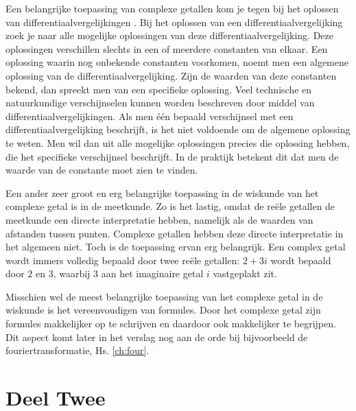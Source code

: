 \documentclass[11pt,fleqn]{book} %
\begin{document}
Een belangrijke toepassing van complexe getallen kom je tegen bij het oplossen van differentiaalvergelijkingen \cite{complexegetallenleiden}. Bij het oplossen van een differentiaalvergelijking zoek je naar alle mogelijke oplossingen van deze differentiaalvergelijking. Deze oplossingen verschillen slechts in een of meerdere constanten van elkaar. Een oplossing waarin nog onbekende constanten voorkomen, noemt men een algemene oplossing van de differentiaalvergelijking. Zijn de waarden van deze constanten bekend, dan spreekt men van een specifieke oplossing. Veel technische en natuurkundige verschijnselen kunnen worden beschreven door middel van differentiaalvergelijkingen. Als men één bepaald verschijnsel met een differentiaalvergelijking beschrijft, is het niet voldoende om de algemene oplossing te weten. Men wil dan uit alle mogelijke oplossingen precies die oplossing hebben, die het specifieke verschijnsel beschrijft. In de praktijk betekent dit dat men de waarde van de constante moet zien te vinden.

Een ander zeer groot en erg belangrijke toepassing in de wiskunde van het complexe getal is in de meetkunde. Zo is het lastig, omdat de reële getallen de meetkunde een directe interpretatie hebben, namelijk als de waarden van afstanden tussen punten. Complexe getallen hebben deze directe interpretatie in het algemeen niet. Toch is de toepassing ervan erg belangrijk. Een complex getal wordt immers volledig bepaald door twee reële getallen: $2 + 3i$ wordt bepaald door $2$ en $3$, waarbij $3$ aan het imaginaire getal $i$ vastgeplakt zit.

Misschien wel de meest belangrijke toepassing van het complexe getal in de wiskunde is het vereenvoudigen van formules. Door het complexe getal zijn formules makkelijker op te schrijven en daardoor ook makkelijker te begrijpen. Dit aspect komt later in het verslag nog aan de orde bij bijvoorbeeld de fouriertransformatie, Hs. \ref{ch:four}\cite{nogmeergetallen}\cite{cgetallenincontext}.




\part{Deel Twee}

\end{document}
